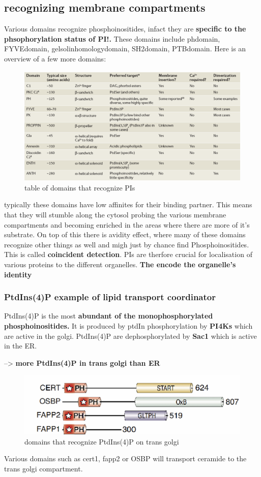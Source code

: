 \documentclass[../main.tex]{subfiles}
\begin{document}
\subsection{recognizing membrane compartments}
Various domains recognize phosphoinositides, infact they are \textbf{ specific to the phsophorylation status of PI!.} These domains include \gls{phdomain}, \gls{FYVEdomain}, \gls{gelsolinhomologydomain}, \gls{SH2domain}, \gls{PTBdomain}. Here is an overview of a few more domains:
\begin{figure}[H]
    \centering
    \includegraphics[width=\linewidth]{domainOverview.png}
    \caption{table of domains that recognize PIs}
    \label{fig:enter-label}
\end{figure}

typically these domains have low affinites for their binding partner. This means that they will stumble along the cytosol probing the various membrane compartments and becoming enriched in the areas where there are more of it's substrate. On top of this there is avidity effect, where many of these domains recognize other things as well and migh just by chance find Phosphoinositides. This is called \textbf{coincident detection}. PIs are therfore crucial for localisation of various proteins to the different organelles. \textbf{The encode the organelle's identity}

\subsubsection{PtdIns(4)P example of lipid transport coordinator}
PtdIns(4)P is the most \textbf{abundant of the monophosphorylated  
phosphoinositides.} It is produced by ptdIn phosphorylation by \textbf{\gls{PI4Ks}} which are active in the golgi. PtdIns(4)P are dephosphorylated by \textbf{\gls{Sac1} }which is active in the ER. 

--> \textbf{more PtdIns(4)P in trans golgi than ER}
\begin{figure}[H]
    \centering
    \includegraphics[width=0.5\linewidth]{moreDomainShit.png}
    \caption{domains that recognize PtdIns(4)P on trans golgi}
    \label{fig:enter-label}
\end{figure}
Various domains such as \gls{cert1}, \gls{fapp2} or \gls{OSBP} will transport ceramide to the trans golgi compartment.
\end{document}
